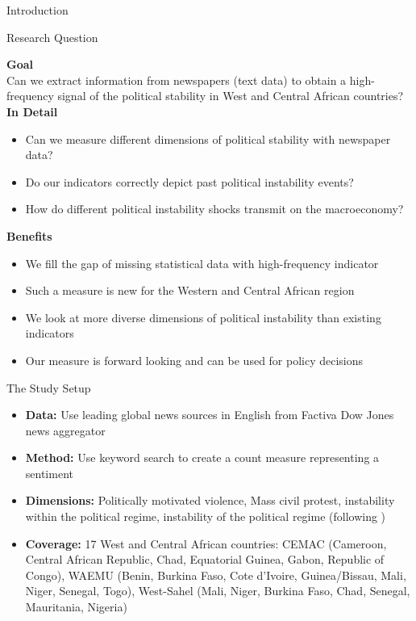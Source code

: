 \documentclass[aspectratio=169,10pt]{beamer}
\begin{document}
\begin{section}[Introduction]{Introduction}
\begin{frame}[label=overview]{Research Question}

\textbf{Goal}\\
Can we extract information from newspapers (text data) to obtain a high-frequency signal of the political stability in West and Central African countries? \\
\vspace{0.25cm}
\textbf{In Detail}
    \begin{itemize}
        \item Can we measure different dimensions of political stability with newspaper data?
        \item Do our indicators correctly depict past political instability events?
        \item How do different political instability shocks transmit on the macroeconomy?
    \end{itemize}
    \vspace{0.25cm}
    \textbf{Benefits}
        \begin{itemize}
        \item We fill the gap of missing statistical data with high-frequency indicator
        \item Such a measure is new for the Western and Central African region
        \item We look at more diverse dimensions of political instability than existing indicators
        \item Our measure is forward looking and can be used for policy decisions
    \end{itemize}
\end{frame}

\begin{frame}[label=overview]{The Study Setup}
    \begin{itemize}
        \item \textbf{Data:} Use leading global news sources in English from Factiva Dow Jones news aggregator \vspace{0.2cm}
        \item \textbf{Method:} Use keyword search to create a count measure representing a sentiment \vspace{0.2cm}
        \item \textbf{Dimensions:} Politically motivated violence, Mass civil protest, instability within the political regime, instability of the political regime (following \cite{JONGAPIN2009}) \vspace{0.2cm}
        \item \textbf{Coverage:} 17 West and Central African countries: CEMAC (Cameroon, Central African Republic, Chad, Equatorial Guinea, Gabon, Republic of Congo), WAEMU (Benin, Burkina Faso, Cote d’Ivoire, Guinea/Bissau, Mali, Niger, Senegal, Togo), West-Sahel (Mali, Niger, Burkina Faso, Chad, Senegal, Mauritania, Nigeria)
    \end{itemize}
\end{frame}




\end{section}
\end{document}
